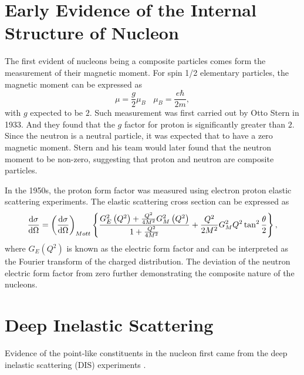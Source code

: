 \section {Early Evidence of the Internal Structure of Nucleon}
The first evident of nucleons being a composite particles comes form the 
measurement of their magnetic moment. For spin 1/2 elementary particles, the 
magnetic moment can be expressed as 
\begin{equation}
\mu = \frac{g}{2}\mu_B ~~~~ \mu_B = \frac{e\hbar}{2m},
\end{equation}
with $g$ expected to be $2$. Such measurement was first carried out by Otto 
Stern in 1933. And they found that the $g$ factor for proton is significantly 
greater than $2$. Since the neutron is a neutral particle, it was expected that
to have a zero magnetic moment. Stern and his team would later found that the 
neutron moment to be non-zero, suggesting that proton and neutron are composite
particles.

In the 1950s, the proton form factor was measured using electron proton elastic
scattering experiments\cite{hofstadter1956}. The elastic scattering cross 
section can be expressed as 
\begin{equation}
\dv{\sigma}{\Omega} = \left(\dv{\sigma}{\Omega}\right)_{Mott}\left\{ 
	\frac{G_E^2\left(Q^2\right) + \frac{Q^2}{4M^2}G_M^2 \left(Q^2\right)}
	{1 + \frac{Q^2}{4M^2}} + \frac{Q^2}{2M^2} G^2_M{Q^2}\tan^2\frac{\theta}{2}
	\right\},
\end{equation}
where $G_E\left(Q^2\right)$ is known as the electric form factor and can be 
interpreted as the Fourier transform of the charged distribution. The deviation
of the neutron electric form factor from zero further demonstrating the 
composite nature of the nucleons.

\section {Deep Inelastic Scattering}
\label{sec:dis}
Evidence of the point-like constituents in the nucleon first came from the deep
inelastic scattering (DIS) experiments \cite{breidenbach1969}. 


